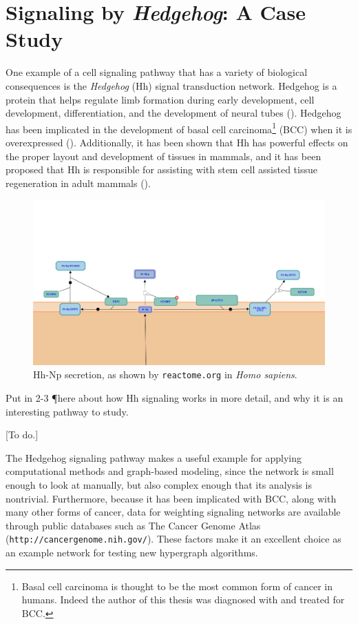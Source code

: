 \documentclass[12pt,twoside]{reedthesis}
\newcommand{\new}[2]{{\color{red}#1 [#2]}}
\theoremstyle{definition}
\begin{document}
\section{Signaling by \emph{Hedgehog}: A Case Study}

One example of a cell signaling pathway that has a variety of biological consequences is the \textit{Hedgehog} (Hh) signal transduction network. Hedgehog is a protein that helps regulate limb formation during early development, cell development, differentiation, and the development of neural tubes (\cite{Hui2011}). Hedgehog has been implicated in the development of basal cell carcinoma\footnote{Basal cell carcinoma is thought to be the most common form of cancer in humans\cite{paper}. Indeed the author of this thesis was diagnosed with and treated for BCC.} (BCC) when it is overexpressed (\cite{Beachy2004}). Additionally, it has been shown that Hh has powerful effects on the proper layout and development of tissues in mammals, and it has been proposed that Hh is responsible for assisting with stem cell assisted tissue regeneration in adult mammals (\cite{thing}).

\begin{figure}[h]
  \begin{center}
    \includegraphics[width=\textwidth]{Hh-Np_secretion}
  \caption[Hedgehog secretion in \textit{Homo sapiens}]{Hh-Np secretion, as shown by \texttt{reactome.org} in \textit{Homo sapiens}.}
  \label{fig:Hh-Np_secretion}
  \end{center}
\end{figure}

\new{
Put in 2-3 \P here about how Hh signaling works in more detail, and why it is an interesting pathway to study.

}{To do.}

The Hedgehog signaling pathway makes a useful example for applying computational methods and graph-based modeling, since the network is small enough to look at manually, but also complex enough that its analysis is nontrivial. Furthermore, because it has been implicated with BCC, along with many other forms of cancer, data for weighting signaling networks are available through public databases such as The Cancer Genome Atlas (\texttt{http://cancergenome.nih.gov/}). These factors make it an excellent choice as an example network for testing new hypergraph algorithms.\par
\end{document}
